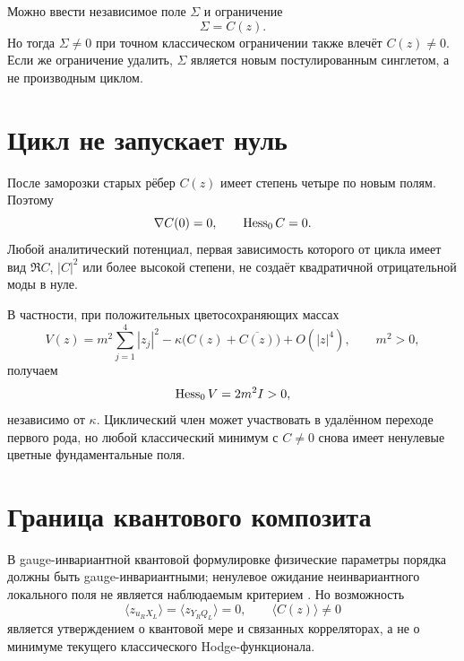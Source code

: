 Можно ввести независимое поле $\Sigma$ и ограничение
\begin{equation}
 \Sigma=C(z).
 \label{eq:v7-composite-cycle-auxiliary-constraint}
\end{equation}
Но тогда $\Sigma\ne0$ при точном классическом ограничении также влечёт
$C(z)\ne0$. Если же ограничение удалить, $\Sigma$ является новым
постулированным синглетом, а не производным циклом.

\section{Цикл не запускает нуль}

После заморозки старых рёбер $C(z)$ имеет степень четыре по новым полям.
Поэтому
\begin{equation}
 \nabla C(0)=0,\qquad
 \operatorname{Hess}_0 C=0.
 \label{eq:v7-composite-cycle-zero-hessian}
\end{equation}
Любой аналитический потенциал, первая зависимость которого от цикла имеет
вид $\Re C$, $|C|^2$ или более высокой степени, не создаёт квадратичной
отрицательной моды в нуле.

В частности, при положительных цветосохраняющих массах
\begin{equation}
 V(z)=m^2\sum_{j=1}^{4}|z_j|^2
 -\kappa\bigl(C(z)+\overline{C(z)}\bigr)+O(|z|^4),
 \qquad m^2>0,
 \label{eq:v7-composite-cycle-massive-potential}
\end{equation}
получаем
\begin{equation}
 \operatorname{Hess}_0V=2m^2I>0,
 \label{eq:v7-composite-cycle-positive-origin}
\end{equation}
независимо от $\kappa$. Циклический член может участвовать в удалённом
переходе первого рода, но любой классический минимум с $C\ne0$ снова имеет
ненулевые цветные фундаментальные поля.

\section{Граница квантового композита}

В gauge-инвариантной квантовой формулировке физические параметры порядка
должны быть gauge-инвариантными; ненулевое ожидание неинвариантного
локального поля не является наблюдаемым критерием
\cite{v7-composite-cycle-elitzur}. Но возможность
\begin{equation}
 \langle z_{u_RX_L}\rangle
 =\langle z_{Y_RQ_L}\rangle=0,
 \qquad
 \langle C(z)\rangle\ne0
 \label{eq:v7-composite-cycle-quantum-condensate}
\end{equation}
является утверждением о квантовой мере и связанных корреляторах, а не о
минимуме текущего классического Hodge-функционала.


